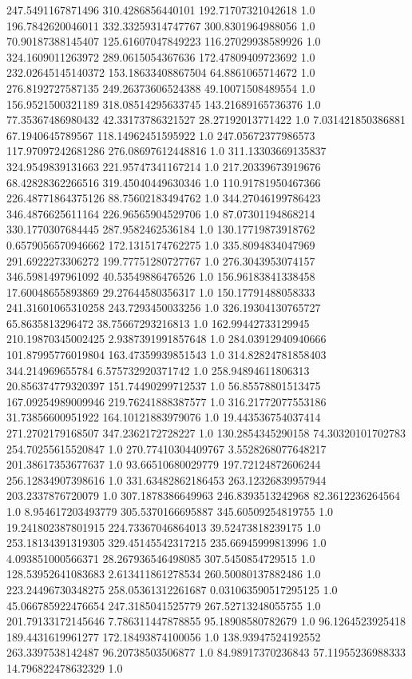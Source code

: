 247.5491167871496	310.4286856440101	192.71707321042618	1.0
196.7842620046011	332.33259314747767	300.8301964988056	1.0
70.90187388145407	125.61607047849223	116.27029938589926	1.0
324.1609011263972	289.0615054367636	172.47809409723692	1.0
232.02645145140372	153.18633408867504	64.8861065714672	1.0
276.8192727587135	249.26373606524388	49.10071508489554	1.0
156.9521500321189	318.08514295633745	143.21689165736376	1.0
77.35367486980432	42.33173786321527	28.27192013771422	1.0
7.031421850386881	67.1940645789567	118.14962451595922	1.0
247.05672377986573	117.97097242681286	276.08697612448816	1.0
311.13303669135837	324.9549839131663	221.95747341167214	1.0
217.20339673919676	68.42828362266516	319.45040449630346	1.0
110.91781950467366	226.48771864375126	88.75602183494762	1.0
344.27046199786423	346.4876625611164	226.96565904529706	1.0
87.07301194868214	330.1770307684445	287.9582462536184	1.0
130.17719873918762	0.6579056570946662	172.1315174762275	1.0
335.8094834047969	291.6922273306272	199.77751280727767	1.0
276.3043953074157	346.5981497961092	40.53549886476526	1.0
156.96183841338458	17.60048655893869	29.27644580356317	1.0
150.17791488058333	241.31601065310258	243.7293450033256	1.0
326.19304130765727	65.8635813296472	38.75667293216813	1.0
162.99442733129945	210.19870345002425	2.9387391991857648	1.0
284.03912940940666	101.87995776019804	163.47359939851543	1.0
314.82824781858403	344.214969655784	6.575732920371742	1.0
258.94894611806313	20.856374779320397	151.74490299712537	1.0
56.85578801513475	167.09254989009946	219.76241888387577	1.0
316.21772077553186	31.73856600951922	164.10121883979076	1.0
19.443536754037414	271.2702179168507	347.2362172728227	1.0
130.2854345290158	74.30320101702783	254.70255615520847	1.0
270.77410304409767	3.5528268077648217	201.38617353677637	1.0
93.66510680029779	197.72124872606244	256.12834907398616	1.0
331.63482862186453	263.12326839957944	203.2337876720079	1.0
307.1878386649963	246.8393513242968	82.3612236264564	1.0
8.954617203493779	305.5370166695887	345.60509254819755	1.0
19.241802387801915	224.73367046864013	39.52473818239175	1.0
253.18134391319305	329.45145542317215	235.66945999813996	1.0
4.093851000566371	28.267936546498085	307.5450854729515	1.0
128.53952641083683	2.613411861278534	260.50080137882486	1.0
223.24496730348275	258.05361312261687	0.031063590517295125	1.0
45.066785922476654	247.3185041525779	267.52713248055755	1.0
201.79133172145646	7.786311447878855	95.18908580782679	1.0
96.1264523925418	189.4431619961277	172.18493874100056	1.0
138.93947524192552	263.3397538142487	96.20738503506877	1.0
84.98917370236843	57.11955236988333	14.796822478632329	1.0
